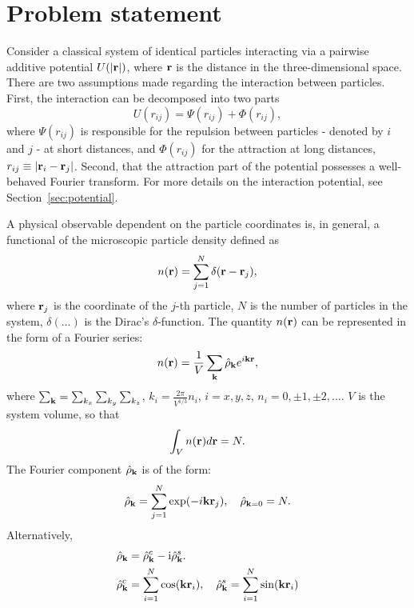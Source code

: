 \section{\label{sec:problem_statement} Problem statement}

Consider a classical system of identical particles interacting via a pairwise additive potential $U(\abs{\vb r})$, where $\vb r$ is the distance in the three-dimensional space. There are two assumptions made regarding the interaction between particles. First, the interaction can be decomposed into two parts
\begin{equation}
	\label{interaction_decomp}
	U(r_{ij}) = \Psi(r_{ij}) + \Phi(r_{ij}),
\end{equation}
where $\Psi(r_{ij})$ is responsible for the repulsion between particles - denoted by $i$ and $j$ -  at short distances, and $\Phi(r_{ij})$ for the attraction at long distances, $r_{ij} \equiv \abs{\vb r_i - \vb r_j}$. Second, that the attraction part of the potential possesses a well-behaved Fourier transform. For more details on the interaction potential, see Section~\ref{sec:potential}.

A physical observable dependent on the particle coordinates is, in general, a functional of the microscopic particle density defined as 
\begin{equation}
	n(\vb r) = \sum_{j=1}^{N} \delta(\vb r - \vb r_j),
\end{equation}
where $\vb r_j$ is the coordinate of the $j$-th particle, $N$ is the number of particles in the system, $\delta(...)$ is the Dirac's $\delta$-function. The quantity $n(\vb r)$ can be represented in the form of a Fourier series:
\begin{equation}
	n(\vb r) = \frac{1}{V} \sum_{\vb k} \hat{\rho}_{\vb k} e^{i\vb k \vb r},
\end{equation}
where $\sum_{\vb k} = \sum_{k_x}\sum_{k_y}\sum_{k_z}$, $k_i = \frac{2\pi}{V^{1/3}}n_i$, $i=x,y,z$, $n_i=0,\pm 1, \pm 2, \dotsc$. $V$ is the system volume, so that
$$ \int_V n(\vb r) d\vb r = N.$$
The Fourier component $\hat{\rho}_{\vb k}$ is of the form:
\begin{equation}
	\label{def:rho_k}
	\hat{\rho}_{\vb k} = \sum_{j=1}^N\exp(-i\vb k \vb r_j), \quad \hat{\rho}_{\vb k = 0} = N. 
\end{equation}
Alternatively, 
\begin{eqnarray}
	\label{rho_k_sin}
	& \hat{\rho}_{\vb k} = \hat{\rho}_{\vb k}^c - {\rm i}\hat{\rho}_{\vb k}^s.
	\nonumber\\
	& \hat{\rho}_{\vb k}^c = \sum_{i=1}^N \cos(\vb k \vb r_i), \quad \hat{\rho}_{\vb k}^s = \sum_{i=1}^N \sin(\vb k \vb r_i)
\end{eqnarray}


